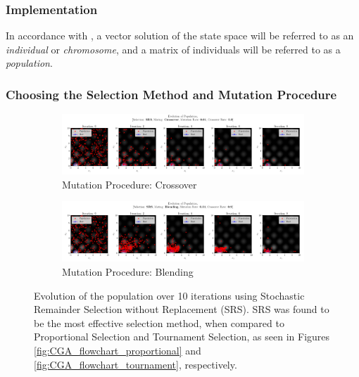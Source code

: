 \documentclass[10pt]{article}
\begin{document}
\begin{multicols}{2}
\subsubsection{Implementation}
\label{sec:CGA_implementation}

In accordance with \cite{parks2023geneticalgorithms}, a vector solution of the state space will be referred to as an \textit{individual} or \textit{chromosome}, and a matrix of individuals will be referred to as a \textit{population}. 

\end{multicols}

\subsubsection{Choosing the Selection Method and Mutation Procedure}

\begin{figure}[H]
    \centering
    \begin{subfigure}{\textwidth}
        \centering
        \includegraphics[width=\textwidth]{../figures/KBF/10_iters/SRS/Crossover/0.01_0.9_Population.png}
        \caption{Mutation Procedure: Crossover}
        \label{fig:CGA_flowchart_srs_crossover}
    \end{subfigure}
    \begin{subfigure}{\textwidth}
        \centering
        \includegraphics[width=\textwidth]{../figures/KBF/10_iters/SRS/Blending/0.01_0.9_Population.png}
        \caption{Mutation Procedure: Blending}
        \label{fig:CGA_flowchart_srs_blending}
    \end{subfigure}
    \captionsetup{justification=centering}
    \caption{Evolution of the population over 10 iterations using Stochastic Remainder Selection without Replacement (SRS). SRS was found to be the most effective selection method, when compared to Proportional Selection and Tournament Selection, as seen in Figures \ref{fig:CGA_flowchart_proportional} and \ref{fig:CGA_flowchart_tournament}, respectively.}
    \label{fig:CGA_flowchart_srs}
\end{figure}
\end{document}
